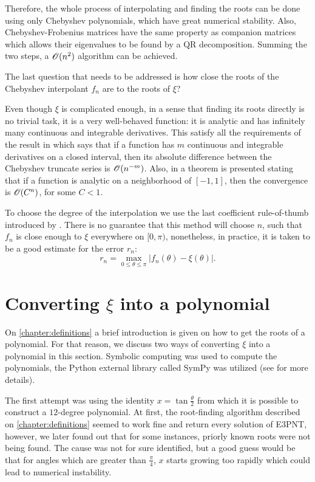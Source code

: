 Therefore, the whole process of interpolating and finding the roots can be done using only Chebyshev polynomials, which have great numerical stability. Also, Chebyshev-Frobenius matrices have the same property as companion matrices which allows their eigenvalues to be found by a QR decomposition. Summing the two steps, a $\mathscr{O}(n^2)$ algorithm can be achieved.

The last question that needs to be addressed is how close the roots of the Chebyshev interpolant $f_n$ are to the roots of $\xi$?

Even though $\xi$ is complicated enough, in a sense that finding its roots directly is no trivial task, it is a very well-behaved function: it is analytic and  has infinitely many continuous and integrable derivatives. This satisfy all the requirements of the result in  which says that if a function has $m$ continuous and integrable derivatives on a closed interval, then its absolute difference between the Chebyshev truncate series is $\mathscr{O}(n^{-m})$. Also, in  a theorem is presented stating that if a function is analytic on a neighborhood of $[-1, 1]$, then the convergence is $\mathscr{O}(C^n)$, for some $C<1$.

To choose the degree of the interpolation we use the last coefficient rule-of-thumb introduced by . There is no guarantee that this method will choose $n$, such that $f_n$ is close enough to $\xi$ everywhere on $[0, \pi)$, nonetheless, in practice, it is taken to be a good estimate for the error $r_n$:
\begin{equation}
r_n = \max_{0 \le \theta \le \pi} |f_n(\theta) - \xi(\theta)|.
\end{equation}


\section{Converting $\xi$ into a polynomial}

On \autoref{chapter:definitions} a brief introduction is given on how to get the roots of a polynomial. For that reason, we discuss two ways of converting $\xi$ into a polynomial in this section. Symbolic computing was used to compute the polynomials, the Python external library called SymPy was utilized (see  for more details).

The first attempt was using the identity $x = \tan{\frac{\theta}{2}}$ from which it is possible to construct a $12$-degree polynomial. At first,  the root-finding algorithm described on \autoref{chapter:definitions} seemed to work fine and return every solution of E3PNT, however, we later found out that for some instances, priorly known roots were not being found. The cause was not for sure identified, but a good guess would be that for angles which are greater than $\frac{\pi}{4}$, $x$ starts growing too rapidly which could lead to numerical instability.

